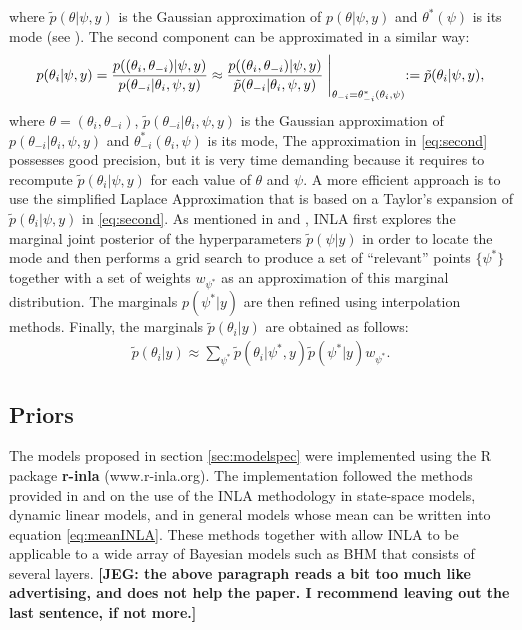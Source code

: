 \documentclass[12pt]{amsart}
\theoremstyle{plain}
\theoremstyle{definition}
\theoremstyle{remark}
\newcommand{\jeg}[1]{\color{ProcessBlue}\textbf{[JEG: #1]}\normalcolor}
\begin{document}
where $\tilde p(\theta|\psi,y)$ is the Gaussian approximation of
$p(\theta|\psi,y)$ and $\theta^*(\psi)$ is its mode (see \cite{Rue2009}). The
second component can be approximated in a similar way:
\begin{equation}\label{eq:second}
  p(\theta_i|\psi,y)  =\frac{p((\theta_i,\theta_{-i})|\psi,y)}{p(\theta_{-i}|\theta_i,\psi,y)} %
   \approx \frac{p((\theta_i,\theta_{-i})|\psi,y)}{\tilde p(\theta_{-i}|\theta_i,\psi,y)} \Biggm |_{\theta_{-i}=\theta_{-i}^*(\theta_i,\psi)}:=\tilde p(\theta_i|\psi,y),
\end{equation}
where $\theta=(\theta_i,\theta_{-i})$, $\tilde p(\theta_{-i}|\theta_i,\psi,y)$ is the Gaussian approximation of
$p(\theta_{-i}|\theta_i,\psi,y)$ and $\theta_{-i}^*(\theta_i,\psi)$ is its mode,  
The approximation in \eqref{eq:second} possesses good precision, but it is very time demanding because it
requires to recompute $\tilde p(\theta_i|\psi,y)$ for each value of $\theta$ and $\psi$. A
more efficient approach is to use the simplified Laplace Approximation that is
based on a Taylor's expansion of $\tilde p(\theta_i|\psi,y)$ in 
\eqref{eq:second}. As mentioned in \cite{Rue2009} and \cite{Blangiardo2013},
INLA first explores the marginal joint posterior of the hyperparameters $\tilde
p(\psi | y)$ in order to locate the mode and then performs a grid search to 
produce a set of ``relevant'' points $\{\psi^*\}$ together with a set of weights
$w_{\psi^*}$ as an approximation of this marginal distribution. The marginals
$p(\psi^*|y)$ are then refined using interpolation methods. Finally, the marginals
$\tilde p(\theta_i|y)$ are obtained as follows:
\begin{align*}
  \tilde p(\theta_i|y) \approx \sum_{\psi^*}\tilde p(\theta_i|\psi^*,y)\tilde p(\psi^*|y)w_{\psi^*}.
\end{align*}

\subsection{Priors}
The models proposed in section \ref{sec:modelspec} were
implemented using the R package \textbf{r-inla} (www.r-inla.org). The
implementation followed the methods provided in \cite{Ruiz-Cardenas2012} and
\cite{Muff2015} on the use of the INLA methodology in state-space models,
dynamic linear models, and in general models whose mean can be written
into equation \eqref{eq:meanINLA}. These
methods together with \cite{Martins2013} allow INLA to be applicable to a wide array of Bayesian models such as BHM that consists of several layers. \jeg{the above paragraph reads a bit too much like advertising, and does not help the paper. I recommend leaving out the last sentence, if not more.}
\end{document}
